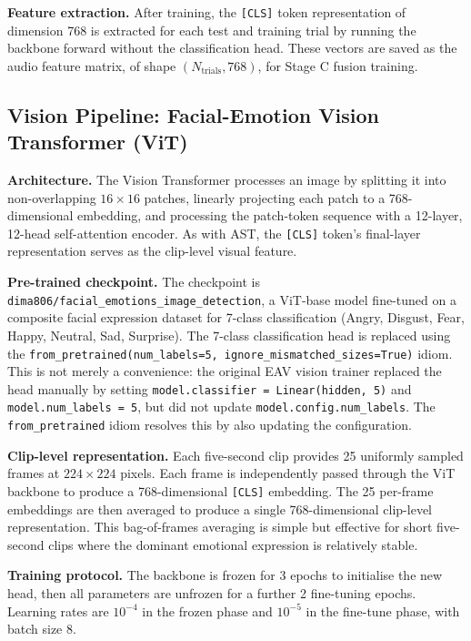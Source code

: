 \textbf{Feature extraction.} After training, the \texttt{[CLS]} token representation of dimension 768 is extracted for each test and training trial by running the backbone forward without the classification head. These vectors are saved as the audio feature matrix, of shape $(N_{\mathrm{trials}}, 768)$, for Stage C fusion training.

\subsection{Vision Pipeline: Facial-Emotion Vision Transformer (ViT)}
\textbf{Architecture.} The Vision Transformer \cite{Dosovitskiy2021ViT} processes an image by splitting it into non-overlapping $16\times16$ patches, linearly projecting each patch to a 768-dimensional embedding, and processing the patch-token sequence with a 12-layer, 12-head self-attention encoder. As with AST, the \texttt{[CLS]} token's final-layer representation serves as the clip-level visual feature.

\textbf{Pre-trained checkpoint.} The checkpoint is \texttt{dima806/facial\_emotions\_image\_detection}, a ViT-base model fine-tuned on a composite facial expression dataset for 7-class classification (Angry, Disgust, Fear, Happy, Neutral, Sad, Surprise). The 7-class classification head is replaced using the \texttt{from\_pretrained(num\_labels=5, ignore\_mismatched\_sizes=True)} idiom. This is not merely a convenience: the original EAV vision trainer replaced the head manually by setting \texttt{model.classifier = Linear(hidden, 5)} and \texttt{model.num\_labels = 5}, but did not update \texttt{model.config.num\_labels}. The \texttt{from\_pretrained} idiom resolves this by also updating the configuration.

\textbf{Clip-level representation.} Each five-second clip provides 25 uniformly sampled frames at $224\times224$ pixels. Each frame is independently passed through the ViT backbone to produce a 768-dimensional \texttt{[CLS]} embedding. The 25 per-frame embeddings are then averaged to produce a single 768-dimensional clip-level representation. This bag-of-frames averaging is simple but effective for short five-second clips where the dominant emotional expression is relatively stable.

\textbf{Training protocol.} The backbone is frozen for 3 epochs to initialise the new head, then all parameters are unfrozen for a further 2 fine-tuning epochs. Learning rates are $10^{-4}$ in the frozen phase and $10^{-5}$ in the fine-tune phase, with batch size 8.

